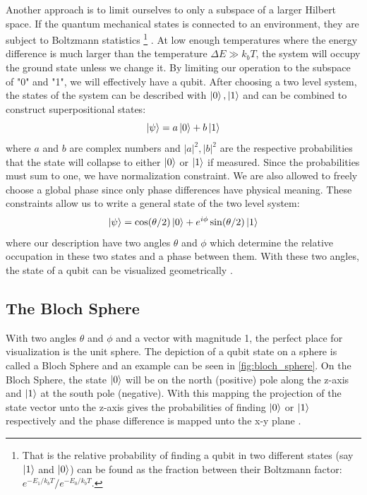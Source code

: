 Another approach is to limit ourselves to only a subspace of a larger Hilbert space. If the quantum mechanical states is connected to an environment, they are subject to Boltzmann statistics \footnote{That is the relative probability of finding a qubit in two different states (say $\ket{1}$ and $\ket{0}$) can be found as the fraction between their Boltzmann factor: $e^{-E_1 / k_b  T} / e^{- E_0 / k_b  T}$.}   \cite{kittel_thermal_1980}. At low enough temperatures where the energy difference is much larger than the temperature $\Delta E \gg k_b T$, the system will occupy the ground state unless we change it. By limiting our operation to the subspace of "0" and "1", we will effectively have a qubit.
After choosing a two level system, the states of the system can be described with $\ket{0}, \ket{1}$ and can be combined to construct superpositional states:
\begin{equation}
    \ket{\psi} = a \ket{0} + b \ket{1}
\end{equation}
where $a$ and $b$ are complex numbers and $|a|^2, |b|^2$ are the respective probabilities that the state will collapse to either $\ket{0}$ or $\ket{1}$ if measured. Since the probabilities must sum to one, we have normalization constraint. We are also allowed to freely choose a global phase since only phase differences have physical meaning\cite{sakurai_modern_2021}. These constraints allow us to write a general state of the two level system:
\begin{equation}\label{eq:general_2_state}
    \ket{\psi} = \cos (\theta / 2) \ket{0} + e^{i\phi}\sin(\theta / 2)\ket{1}
\end{equation}
where our description have two angles $\theta$ and $\phi$ which determine the relative occupation in these two states and a phase between them. With these two angles, the state of a qubit can be visualized geometrically \cite{krantz_quantum_2019}.

\subsection{The Bloch Sphere}
With two angles $\theta$ and $\phi$ and a vector with magnitude 1, the perfect place for visualization is the unit sphere. The depiction of a qubit state on a sphere is called a Bloch Sphere and an example can be seen in \ref{fig:bloch_sphere}. On the Bloch Sphere, the state $\ket{0}$ will be on the north (positive) pole along the z-axis and $\ket{1}$ at the south pole (negative). With this mapping the projection of the state vector unto the z-axis gives the probabilities of finding $\ket{0}$ or $\ket{1}$ respectively and the phase difference is mapped unto the x-y plane  \cite{krantz_week_2019}.

